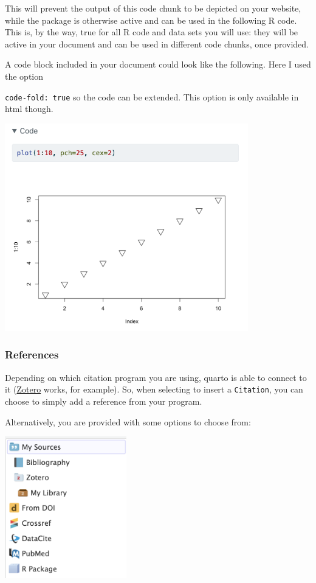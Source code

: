 \documentclass[
  letterpaper,
  DIV=11,
  numbers=noendperiod]{scrreprt}
\begin{document}
This will prevent the output of this code chunk to be depicted on your
website, while the package is otherwise active and can be used in the
following R code. This is, by the way, true for all R code and data sets
you will use: they will be active in your document and can be used in
different code chunks, once provided.

A code block included in your document could look like the following.
Here I used the option

\texttt{code-fold:\ true} so the code can be extended. This option is
only available in html though.

\includegraphics[width=4.16667in,height=\textheight]{img/quarto_intro/Screenshot 2023-10-17 at 17.05.28.png}

\hypertarget{references}{%
\subsubsection{References}\label{references}}

Depending on which citation program you are using, quarto is able to
connect to it (\href{https://www.zotero.org}{Zotero} works, for
example). So, when selecting to insert a \texttt{Citation}, you can
choose to simply add a reference from your program.

Alternatively, you are provided with some options to choose from:

\includegraphics[width=2.08333in,height=\textheight]{img/quarto_intro/Screenshot 2023-10-11 at 15.09.41.png}
\end{document}
